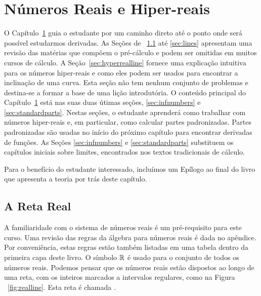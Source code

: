 \graphicspath{ {./figuras/01_reals/} }
\chapter{Números Reais e Hiper-reais}
\label{chp:reals}

O Capítulo~\ref{chp:reals} guia o estudante por um caminho direto até
o ponto onde será possível estudarmos derivadas. As Seções de%
~\ref{sec:realline} até \ref{sec:lines} apresentam uma revisão das
matérias que compõem o pré-cálculo e podem ser omitidas em muitos
cursos de cálculo. A Seção~\ref{sec:hyperrealline} fornece uma
explicação intuitiva para os números hiper-reais e como eles podem
ser usados para encontrar a inclinação de uma curva. Esta seção
não tem nenhum conjunto de problemas e destina-se a formar a base
de uma lição introdutória. O conteúdo principal do Capítulo~\ref{chp:reals}
está nas suas duas útimas seções, \ref{sec:infnumbers} e
\ref{sec:standardparts}. Nestas seções, o estudante aprenderá como
trabalhar com números hiper-reais e, em particular, como calcular
partes padronizadas. Partes padronizadas são usadas no início do próximo
capítulo para encontrar derivadas de funções. As Seções \ref{sec:infnumbers} e 
\ref{sec:standardparts} substituem os capítulos iniciais sobre limites,
encontrados nos textos tradicionais de cálculo.

Para o benefício do estudante interessado, incluímos um Epílogo ao final
do livro que apresenta a teoria por trás deste capítulo.

\section{A Reta Real}
\label{sec:realline}

A familiaridade com o sistema de números reais é um pré-requisito
para este curso. Uma revisão das regras da álgebra para números reais
é dada no apêndice. Por conveniência, estas regras estão também listadas
em uma tabela dentro da primeira capa deste livro. O símbolo
$\mathbb{R}$ é usado para o conjunto de todos os números reais.
Podemos pensar que os números reais estão dispostos ao longo de uma
reta, com os inteiros marcados a intervalos regulares, como na Figura%
~\ref{fig:realline}. Esta reta é chamada .


